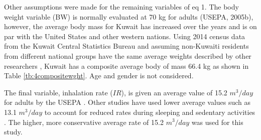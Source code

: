 Other assumptions were made for the remaining variables of eq 1. The body weight variable (BW) is normally evaluated at 70 kg for adults (USEPA, 2005b), however, the average body mass for Kuwait has increased over the years and is on par with the United States and other western nations. Using 2014 census data from the Kuwait Central Statistics Bureau and assuming non-Kuwaiti residents from different national groups have the same average weights described by other researchers \citep{Walpole2012}, Kuwait has a composite average body of mass 66.4 kg as shown in Table \ref{tb:4compositewght}. Age and gender is not considered.
%
\begin{table}[H]
\centering
\caption{Composite Weight of Adults in Kuwait}
\label{tb:4compositewght}
\end{table}
%
The final variable, inhalation rate ($IR$), is given an average value of 15.2 $m^{3}/day$ for adults by the USEPA \citep{USEPA2005a}. Other studies have used lower average values such as 13.1 $m^{3}/day$ to account for reduced rates during sleeping and sedentary activities \citep{Marshall2006}. The higher, more conservative average rate of 15.2 $m^{3}/day$ was used for this study. 

